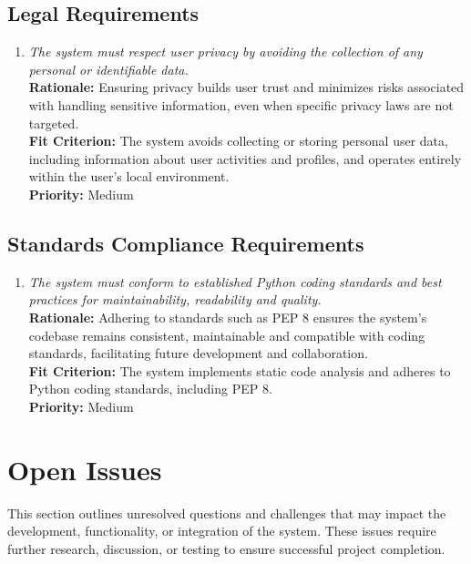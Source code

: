 \documentclass[12pt]{article}
\begin{document}
\subsection{Legal Requirements}
\begin{enumerate}[label=CR-LR \arabic*., wide=0pt, leftmargin=*]
  \item \emph{The system must respect user privacy by avoiding the
    collection of any personal or identifiable data.}\\[2mm]
    {\bf Rationale:} Ensuring privacy builds user trust and minimizes
    risks associated with handling sensitive information, even when
    specific privacy laws are not targeted.\\
    {\bf Fit Criterion:} The system avoids collecting or storing
    personal user data, including information about user activities
    and profiles, and operates entirely within the user’s local environment.\\
    {\bf Priority:} Medium
\end{enumerate}
\subsection{Standards Compliance Requirements}
\begin{enumerate}[label=CR-SCR \arabic*., wide=0pt, leftmargin=*]
  \item \emph{The system must conform to established Python coding
      standards and best practices for maintainability, readability and
    quality.}\\[2mm]
    {\bf Rationale:} Adhering to standards such as PEP 8 ensures the
    system’s codebase remains consistent, maintainable and compatible
    with coding standards, facilitating future development and collaboration.\\
    {\bf Fit Criterion:} The system implements static code analysis
    and adheres to Python coding standards, including PEP 8.\\
    {\bf Priority:} Medium
\end{enumerate}

\section{Open Issues}

This section outlines unresolved questions and challenges that may
impact the development, functionality, or integration of the system.
These issues require further research, discussion, or testing to
ensure successful project completion.\\
\end{document}
